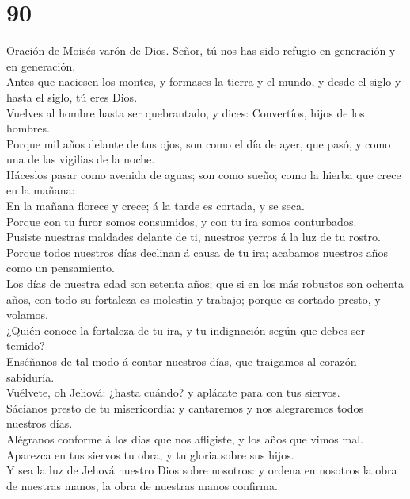 \hypertarget{section-19-90}{%
\section{90}\label{section-19-90}}

 Oración de Moisés varón de Dios. Señor, tú nos has sido
refugio en generación y en generación.\\
 Antes que naciesen los montes, y formases la tierra y el
mundo, y desde el siglo y hasta el siglo, tú eres Dios.\\
 Vuelves al hombre hasta ser quebrantado, y dices:
Convertíos, hijos de los hombres.\\
 Porque mil años delante de tus ojos, son como el día de
ayer, que pasó, y como una de las vigilias de la noche.\\
 Háceslos pasar como avenida de aguas; son como sueño;
como la hierba que crece en la mañana:\\
 En la mañana florece y crece; á la tarde es cortada, y se
seca.\\
 Porque con tu furor somos consumidos, y con tu ira somos
conturbados.\\
 Pusiste nuestras maldades delante de ti, nuestros yerros
á la luz de tu rostro.\\
 Porque todos nuestros días declinan á causa de tu ira;
acabamos nuestros años como un pensamiento.\\
 Los días de nuestra edad son setenta años; que si en los
más robustos son ochenta años, con todo su fortaleza es molestia y
trabajo; porque es cortado presto, y volamos.\\
 ¿Quién conoce la fortaleza de tu ira, y tu indignación
según que debes ser temido?\\
 Enséñanos de tal modo á contar nuestros días, que
traigamos al corazón sabiduría.\\
 Vuélvete, oh Jehová: ¿hasta cuándo? y aplácate para con
tus siervos.\\
 Sácianos presto de tu misericordia: y cantaremos y nos
alegraremos todos nuestros días.\\
 Alégranos conforme á los días que nos afligiste, y los
años que vimos mal.\\
 Aparezca en tus siervos tu obra, y tu gloria sobre sus
hijos.\\
 Y sea la luz de Jehová nuestro Dios sobre nosotros: y
ordena en nosotros la obra de nuestras manos, la obra de nuestras manos
confirma.

